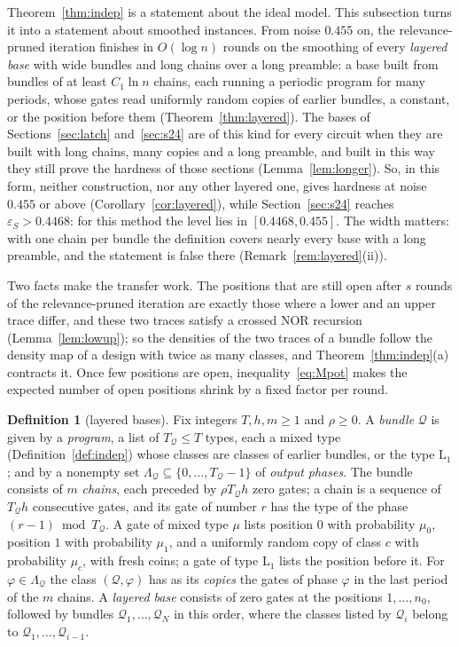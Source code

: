 \documentclass[11pt]{amsart}
\theoremstyle{definition}
\newtheorem{definition}[theorem]{Definition}
\theoremstyle{remark}
\newcommand{\eps}{\varepsilon}
\begin{document}
Theorem~\ref{thm:indep} is a statement about the ideal model. This subsection turns it into a
statement about smoothed instances. From noise $0.455$ on, the relevance-pruned iteration
finishes in $O(\log n)$ rounds on the smoothing of every \emph{layered base} with wide bundles and
long chains over a long preamble: a base built from bundles of at least $C_1\ln n$ chains, each
running a periodic program for many periods, whose gates read uniformly random copies of earlier
bundles, a constant, or the position before them (Theorem~\ref{thm:layered}). The bases of
Sections~\ref{sec:latch} and~\ref{sec:s24} are of this kind for every circuit when they are built
with long chains, many copies and a long preamble, and built in this way they still prove the
hardness of those sections (Lemma~\ref{lem:longer}). So, in this form, neither construction, nor
any other layered one, gives hardness at noise $0.455$ or above (Corollary~\ref{cor:layered}),
while Section~\ref{sec:s24} reaches $\eps_S>0.4468$: for this method the level lies in
$[0.4468,0.455]$. The width matters: with one chain per bundle the definition covers nearly every
base with a long preamble, and the statement is false there (Remark~\ref{rem:layered}(ii)).

Two facts make the transfer work. The positions that are still open after $s$ rounds of the
relevance-pruned iteration are exactly those where a lower and an upper trace differ, and these
two traces satisfy a crossed NOR recursion (Lemma~\ref{lem:lowup}); so the densities of the two
traces of a bundle follow the density map of a design with twice as many classes, and
Theorem~\ref{thm:indep}(a) contracts it. Once few positions are open,
inequality~\eqref{eq:Mpot} makes the expected number of open positions shrink by a fixed factor
per round.

\begin{definition}[layered bases]\label{def:layered}
Fix integers $T,h,m\ge1$ and $\rho\ge0$. A \emph{bundle} $\mathcal Q$ is given by a
\emph{program}, a list of $T_{\mathcal Q}\le T$ types, each a mixed type
(Definition~\ref{def:indep}) whose classes are classes of earlier bundles, or the type
$\mathrm L_1$; and by a nonempty set $\Lambda_{\mathcal Q}\subseteq\{0,\dots,T_{\mathcal Q}-1\}$ of
\emph{output phases}. The bundle consists of $m$ \emph{chains}, each preceded by
$\rho T_{\mathcal Q}h$ zero gates; a chain is a sequence of $T_{\mathcal Q}h$ consecutive gates,
and its gate of number $r$ has the type of the phase $(r-1)\bmod T_{\mathcal Q}$. A gate of mixed
type $\mu$ lists position $0$ with probability $\mu_0$, position $1$ with probability $\mu_1$, and a
uniformly random copy of class $c$ with probability $\mu_c$, with fresh coins; a gate of type
$\mathrm L_1$ lists the position before it. For $\varphi\in\Lambda_{\mathcal Q}$ the class
$(\mathcal Q,\varphi)$ has as its \emph{copies} the gates of phase $\varphi$ in the last period of
the $m$ chains. A \emph{layered base} consists of zero gates at the positions $1,\dots,n_0$,
followed by bundles $\mathcal Q_1,\dots,\mathcal Q_N$ in this order, where the classes listed by
$\mathcal Q_i$ belong to $\mathcal Q_1,\dots,\mathcal Q_{i-1}$.
\end{definition}
\end{document}
